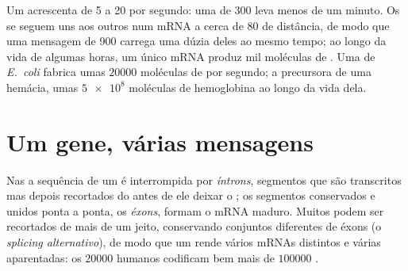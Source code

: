 \begin{example}\label{ex:g11:gene-expression:speed}
Um  acrescenta de 5 a 20  por segundo: uma 
de 300  leva menos de um minuto. Os  se seguem uns
aos outros num mRNA a cerca de 80  de distância, de modo
que uma mensagem de 900  carrega uma dúzia deles ao mesmo
tempo; ao longo da vida de algumas horas, um único mRNA produz mil
moléculas de . Uma  de \emph{E.~coli} fabrica umas
$\num{20000}$ moléculas de  por segundo; a precursora de uma
hemácia, umas $\num{5e8}$ moléculas de hemoglobina ao longo da vida dela.
\end{example}

\section{Um gene, várias mensagens}

\begin{proposition}\label{prop:g11:gene-expression:splicing}
Nas  a sequência de um  é interrompida por
\emph{íntrons}, segmentos que são transcritos mas depois
recortados do  antes de ele deixar o ; os segmentos
conservados e unidos ponta a ponta, os \emph{éxons}, formam o mRNA
maduro. Muitos  podem ser recortados de mais de um jeito,
conservando conjuntos diferentes de éxons (o
\emph{splicing alternativo}), de modo que um  rende vários mRNAs
distintos e várias  aparentadas: os $\num{20000}$ 
humanos codificam bem mais de $\num{100000}$ .
\end{proposition}
\admitted


